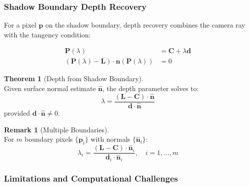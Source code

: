 \documentclass[12pt]{article}
\newcommand{\vect}[1]{\bm{#1}}
\theoremstyle{definition}
\newtheorem{theorem}{Theorem}[subsection]
\newtheorem{remark}{Remark}[subsection]
\begin{document}
\newpage

\subsubsection*{Shadow Boundary Depth Recovery} \label{sec:shadow_depth}

For a pixel $\vect{p}$ on the shadow boundary, depth recovery combines the camera ray with the tangency condition:

\begin{equation}
\boxed{
\begin{aligned}
\vect{P}(\lambda) &= \vect{C} + \lambda \vect{d} \\
(\vect{P}(\lambda) - \vect{L}) \cdot \vect{n}(\vect{P}(\lambda)) &= 0
\end{aligned}
} \label{eq:shadow_depth_system}
\end{equation}

\begin{theorem}[Depth from Shadow Boundary] \label{thm:shadow_depth} ~\\
Given surface normal estimate $\hat{\vect{n}}$, the depth parameter solves to:
\begin{equation}
\boxed{\lambda = \frac{(\vect{L} - \vect{C}) \cdot \hat{\vect{n}}}{\vect{d} \cdot \hat{\vect{n}}}} \label{eq:lambda_solution}
\end{equation}
provided $\vect{d} \cdot \hat{\vect{n}} \neq 0$.
\end{theorem}

\begin{remark}[Multiple Boundaries] \label{rmk:multiple_boundaries} ~\\
For $m$ boundary pixels $\{\vect{p}_i\}$ with normals $\{\hat{\vect{n}}_i\}$:
\begin{equation}
\boxed{\lambda_i = \frac{(\vect{L} - \vect{C}) \cdot \hat{\vect{n}}_i}{\vect{d}_i \cdot \hat{\vect{n}}_i}, \quad i = 1, \ldots, m} \label{eq:multiple_depths}
\end{equation}
\end{remark}

\subsubsection*{Limitations and Computational Challenges} \label{sec:shadow_limitations}
\end{document}
